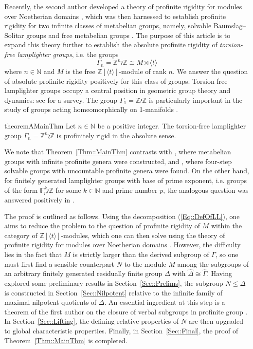 \documentclass{amsart}
\numberwithin{theorem}{section}
\numberwithin{equation}{section}
\newcommand{\Z}{\mathbb{Z}}
\newcommand{\hD}{\widehat{\Delta}}
\newcommand{\hG}{\widehat{\Gamma}}
\begin{document}
Recently, the second author developed a theory of profinite rigidity for modules over Noetherian domains \cite{Wykowski2025_2}, which was then harnessed to establish profinite rigidity for two infinite classes of metabelian groups, namely, solvable Baumslag--Solitar groups \cite{Wykowski2025_2} and free metabelian groups \cite{Wykowski2025_3}. The purpose of this article is to expand this theory further to establish the absolute profinite rigidity of \emph{torsion-free lamplighter groups}, i.e. the groups
\begin{equation} \label{Eq::DefOfLL}
\Gamma_n = \Z^n \wr \Z \cong M \rtimes \langle t\rangle
\end{equation}
where $n \in \mathbb{N}$ and $M$ is the free $\Z[\langle t\rangle]$-module of rank $n$. We answer the question of absolute profinite rigidity positively for this class of groups. Torsion-free lamplighter groups occupy a central position in geometric group theory and dynamics: see \cite{Genevois2024} for a survey. The group $\Gamma_1 = \Z \wr \Z$ is particularly important in the study of groups acting homeomorphically on 1-manifolds \cite{Cannon1996,Balasubramanya2024}.
\begin{restatable}{theoremA}{MainThm}
    \label{Thm::MainThm}
    Let $n \in \mathbb{N}$ be a positive integer. The torsion-free lamplighter group $\Gamma_n = \Z^n \wr \Z$ is profinitely rigid in the absolute sense.
\end{restatable}
We note that Theorem~\ref{Thm::MainThm} contrasts with \cite{Pickel1974}, where metabelian groups with infinite profinite genera were constructed, and \cite{Nikolov2021}, where four-step solvable groups with uncountable profinite genera were found. On the other hand, for finitely generated lamplighter groups with base of prime exponent, i.e. groups of the form $\mathbb{F}_p^k \wr \Z$ for some $k \in \mathbb{N}$ and prime number $p$, the analogous question was answered positively in \cite{Blachar2025}.

The proof is outlined as follows. Using the decomposition (\ref{Eq::DefOfLL}), one aims to reduce the problem to the question of profinite rigidity of $M$ within the category of $\Z[\langle t \rangle]$-modules, which one can then solve using the theory of profinite rigidity for modules over Noetherian domains \cite{Wykowski2025_2}. However, the difficulty lies in the fact that $M$ is strictly larger than the derived subgroup of $\Gamma$, so one must first find a sensible counterpart $N$ to the module $M$ among the subgroups of an arbitrary finitely generated residually finite group $\Delta$ with $\hD \cong \hG$. Having explored some preliminary results in Section~\ref{Sec::Prelims}, the subgroup $N \leq \Delta$ is constructed in Section~\ref{Sec::Nilpotent} relative to the infinite family of maximal nilpotent quotients of $\Delta$. An essential ingredient at this step is a theorem of the first author on the closure of verbal subgroups in profinite group \cite[Theorem 1.4]{Nikolov2007}. In Section~\ref{Sec::Lifting}, the defining relative properties of $N$ are then upgraded to global characteristic properties. Finally, in Section~\ref{Sec::Final}, the proof of Theorem~\ref{Thm::MainThm} is completed.
\end{document}
